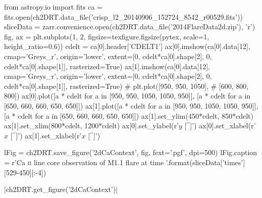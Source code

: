 \begin{pycode}[2DRT]
from astropy.io import fits
ca = fits.open(ch2DRT.data_file('crisp_l2_20140906_152724_8542_r00529.fits'))
sliceData = zarr.convenience.open(ch2DRT.data_file('2014FlareData2d.zip'), 'r')
fig, ax = plt.subplots(1, 2, figsize=texfigure.figsize(pytex, scale=1, height_ratio=0.6))
cdelt = ca[0].header['CDELT1']
ax[0].imshow(ca[0].data[12], cmap='Greys_r', origin='lower', extent=[0, cdelt*ca[0].shape[2], 0, cdelt*ca[0].shape[1]], rasterized=True)
ax[1].imshow(ca[0].data[12], cmap='Greys_r', origin='lower', extent=[0, cdelt*ca[0].shape[2], 0, cdelt*ca[0].shape[1]], rasterized=True)
# plt.plot([950, 950, 1050],
#     [600, 800, 800])
ax[0].plot([a * cdelt for a in [950, 950, 1050, 1050, 950]],
    [a * cdelt for a in [650, 660, 660, 650, 650]])
ax[1].plot([a * cdelt for a in [950, 950, 1050, 1050, 950]],
    [a * cdelt for a in [650, 660, 660, 650, 650]])
ax[1].set_ylim(450*cdelt, 850*cdelt)
ax[1].set_xlim(800*cdelt, 1200*cdelt)
ax[0].set_ylabel(r'$y$ [$^{\prime\prime}$]')
ax[0].set_xlabel(r'$x$ [$^{\prime\prime}$]')
ax[1].set_xlabel(r'$x$ [$^{\prime\prime}$]')

lFig = ch2DRT.save_figure('2dCaContext', fig, fext='.pgf', dpi=500)
lFig.caption = r'Ca \textsc{{ii}} line core observation of M1.1 flare at time {}'.format(sliceData['times'][529-450][:-4])
\end{pycode}

\py[2DRT]|ch2DRT.get_figure('2dCaContext')|

